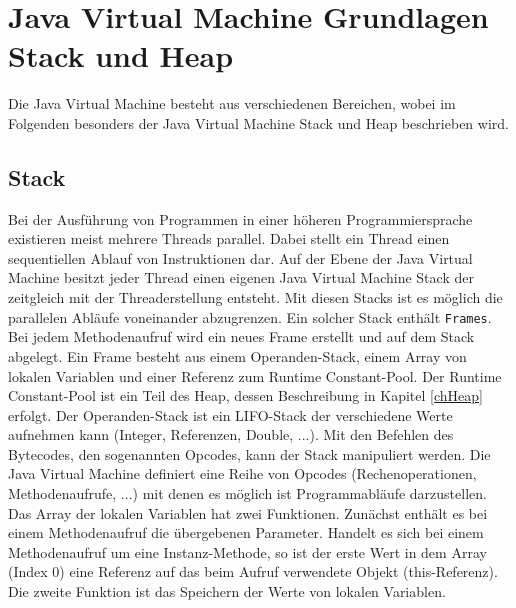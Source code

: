 \documentclass[conference]{IEEEtran}
\begin{document}
\section{Java Virtual Machine Grundlagen Stack und Heap}

Die Java Virtual Machine besteht aus verschiedenen Bereichen, wobei im Folgenden besonders der Java Virtual Machine Stack und Heap beschrieben wird.

\subsection{Stack}
Bei der Ausführung von Programmen in einer höheren Programmiersprache existieren meist mehrere Threads parallel. Dabei stellt ein Thread einen sequentiellen Ablauf von Instruktionen dar. Auf der Ebene der Java Virtual Machine besitzt jeder Thread einen eigenen Java Virtual Machine Stack der zeitgleich mit der Threaderstellung entsteht. Mit diesen Stacks ist es möglich die parallelen Abläufe voneinander abzugrenzen. Ein solcher Stack enthält \verb|Frames|. Bei jedem Methodenaufruf wird ein neues Frame erstellt und auf dem Stack abgelegt. Ein Frame besteht aus einem Operanden-Stack, einem Array von lokalen Variablen und einer Referenz zum Runtime Constant-Pool. Der Runtime Constant-Pool ist ein Teil des Heap, dessen Beschreibung in Kapitel \ref{chHeap} erfolgt. Der Operanden-Stack ist ein LIFO-Stack der verschiedene Werte aufnehmen kann (Integer, Referenzen, Double, ...). Mit den Befehlen des Bytecodes, den sogenannten Opcodes, kann der Stack manipuliert werden. Die Java Virtual Machine definiert eine Reihe von Opcodes (Rechenoperationen, Methodenaufrufe, ...) mit denen es möglich ist Programmabläufe darzustellen. Das Array der lokalen Variablen hat zwei Funktionen. Zunächst enthält es bei einem Methodenaufruf die übergebenen Parameter. Handelt es sich bei einem Methodenaufruf um eine Instanz-Methode, so ist der erste Wert in dem Array (Index 0) eine Referenz auf das beim Aufruf verwendete Objekt (this-Referenz). Die zweite Funktion ist das Speichern der Werte von lokalen Variablen. 
\end{document}
